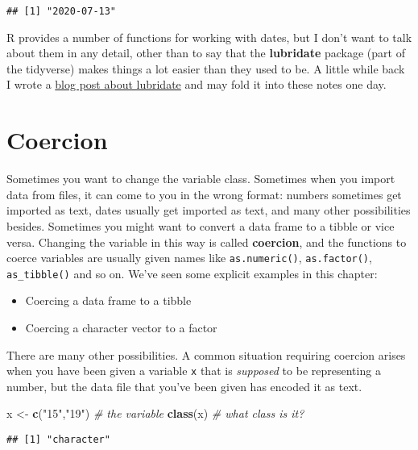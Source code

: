 \documentclass[]{book}
\newenvironment{Shaded}{\begin{snugshade}}{\end{snugshade}}
\newcommand{\CommentTok}[1]{\textcolor[rgb]{0.56,0.35,0.01}{\textit{#1}}}
\newcommand{\KeywordTok}[1]{\textcolor[rgb]{0.13,0.29,0.53}{\textbf{#1}}}
\newcommand{\NormalTok}[1]{#1}
\newcommand{\StringTok}[1]{\textcolor[rgb]{0.31,0.60,0.02}{#1}}
\providecommand{\tightlist}{%
  \setlength{\itemsep}{0pt}\setlength{\parskip}{0pt}}
\begin{document}
\begin{verbatim}
## [1] "2020-07-13"
\end{verbatim}

R provides a number of functions for working with dates, but I don't want to talk about them in any detail, other than to say that the \textbf{lubridate} package (part of the tidyverse) makes things a lot easier than they used to be. A little while back I wrote a \href{http://djnavarro.net/post/2018-05-02-lubridate/}{blog post about lubridate} and may fold it into these notes one day.

\hypertarget{coercion}{%
\section{Coercion}\label{coercion}}

Sometimes you want to change the variable class. Sometimes when you import data from files, it can come to you in the wrong format: numbers sometimes get imported as text, dates usually get imported as text, and many other possibilities besides. Sometimes you might want to convert a data frame to a tibble or vice versa. Changing the variable in this way is called \textbf{coercion}, and the functions to coerce variables are usually given names like \texttt{as.numeric()}, \texttt{as.factor()}, \texttt{as\_tibble()} and so on. We've seen some explicit examples in this chapter:

\begin{itemize}
\tightlist
\item
  Coercing a data frame to a tibble
\item
  Coercing a character vector to a factor
\end{itemize}

There are many other possibilities. A common situation requiring coercion arises when you have been given a variable \texttt{x} that is \emph{supposed} to be representing a number, but the data file that you've been given has encoded it as text.

\begin{Shaded}
\begin{Highlighting}[]
\NormalTok{x <-}\StringTok{ }\KeywordTok{c}\NormalTok{(}\StringTok{"15"}\NormalTok{,}\StringTok{"19"}\NormalTok{)  }\CommentTok{# the variable}
\KeywordTok{class}\NormalTok{(x)           }\CommentTok{# what class is it?}
\end{Highlighting}
\end{Shaded}

\begin{verbatim}
## [1] "character"
\end{verbatim}
\end{document}
